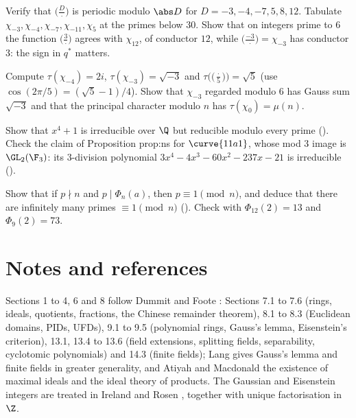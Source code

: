 \begin{exercise}\label{ex:rings:kronecker-table}
Verify that $\bigl(\frac D\cdot\bigr)$ is periodic modulo $\abs D$ for $D=-3,-4,-7,5,8,12$. Tabulate $\chi_{-3},\chi_{-4},\chi_{-7},\chi_{-11},\chi_5$ at the primes below $30$. Show
that on integers prime to $6$ the function $\bigl(\frac3\cdot\bigr)$ agrees with $\chi_{12}$, of conductor $12$, while $\bigl(\frac{-3}\cdot\bigr)=\chi_{-3}$ has conductor $3$: the sign in $q^*$
matters.
\end{exercise}

\begin{exercise}\label{ex:rings:gauss-sums}
Compute $\tau(\chi_{-4})=2i$, $\tau(\chi_{-3})=\sqrt{-3}$ and $\tau\bigl(\bigl(\frac\cdot5\bigr)\bigr)=\sqrt5$ (use $\cos(2\pi/5)=(\sqrt5-1)/4$). Show that $\chi_{-3}$ regarded modulo $6$ has
Gauss sum $\sqrt{-3}$ and that the principal character modulo $n$ has $\tau(\chi_0)=\mu(n)$.
\end{exercise}

\begin{exercise}\label{ex:rings:x4}
Show that $x^4+1$ is irreducible over $\Q$ but reducible modulo every prime (). Check the claim of Proposition prop:ns for
$\curve{11a1}$, whose mod $3$ image is $\GL_2(\F_3)$: its $3$-division polynomial $3x^4-4x^3-60x^2-237x-21$ is irreducible ().
\end{exercise}

\begin{exercise}\label{ex:rings:cyclotomic-primes}
Show that if $p\nmid n$ and $p\mid\Phi_n(a)$, then $p\equiv1\pmod n$, and deduce that there are infinitely many primes $\equiv1\pmod n$
(). Check with $\Phi_{12}(2)=13$ and $\Phi_9(2)=73$.
\end{exercise}

\section{Notes and references}\label{sec:rings:notes}

Sections 1 to 4, 6 and 8 follow Dummit and Foote \cite{DummitFoote}: Sections 7.1 to 7.6 (rings, ideals, quotients, fractions, the Chinese
remainder theorem), 8.1 to 8.3 (Euclidean domains, PIDs, UFDs), 9.1 to 9.5 (polynomial rings, Gauss's lemma, Eisenstein's criterion),
13.1, 13.4 to 13.6 (field extensions, splitting fields, separability, cyclotomic polynomials) and 14.3 (finite fields); Lang
\cite[Chapter IV, Section 2, and Chapter V, Section 5]{Lang} gives Gauss's lemma and finite fields in greater generality, and Atiyah and
Macdonald \cite[Chapter 1]{AtiyahMacdonald} the existence of maximal ideals and the ideal theory of products. The Gaussian and
Eisenstein integers are treated in Ireland and Rosen \cite[Chapter 1]{IrelandRosen}, together with unique factorisation in $\Z$.

